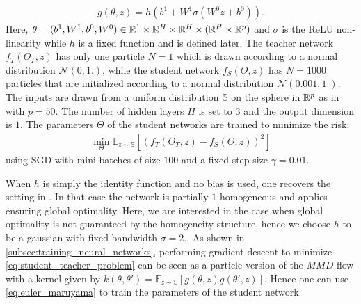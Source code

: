 \begin{align}
	g(\theta,z) = h(b^{1}+W^{1}\sigma(W^{0}z+b^{0})).
\end{align}
Here, $\theta = (b^{1},W^{1},b^{0},W^{0}) \in {{\mathbb R}}^1\times {{\mathbb R}}^{H}\times {{\mathbb R}}^{H} \times ({{\mathbb R}}^{H}\times{{\mathbb R}}^{p})$ and $\sigma$ is the ReLU non-linearity while $h$ is a fixed function and is defined later.
The teacher network $f_{T}(\Theta_T,z)$ has only one particle $N=1$ which is drawn  according to a normal distribution $\mathcal{N}(0,1.)$, while the student network $f_{S}(\Theta,z)$ has $N=1000$ particles that are initialized according to a normal distribution $\mathcal{N}(0.001,1.)$.  The inputs are drawn from a uniform distribution $\mathbb{S}$ on the sphere in ${{\mathbb R}}^p$ as in \cite{Chizat:2018a} with $p=50$. The number of hidden layers $H$ is set to $3$ and the output dimension is $1$.   
The parameters $\Theta$ of the student networks are trained to minimize the risk:
\begin{align}\label{eq:student_teacher_problem}
	\min_{\Theta} \mathbb{E}_{z\sim \mathbb{S} }[(f_T(\Theta_T,z )- f_S(\Theta,z))^2]
\end{align}
using SGD with mini-batches of size $100$ and a fixed step-size $\gamma=0.01$.

When $h$ is simply the identity function and no bias is used, one recovers the setting in \cite{Chizat:2018a}. In that case the network is partially $1$-homogeneous and \cite[Theorem 3.5]{Chizat:2018a} applies ensuring global optimality. Here, we are interested in the case when global optimality is not guaranteed by the homogeneity structure, hence we choose $h$ to be a gaussian with fixed bandwidth $\sigma=2.$. 
As shown in \cref{subsec:training_neural_networks}, performing gradient descent to minimize \cref{eq:student_teacher_problem} can be seen as a particle version of the $MMD$ flow with a kernel given by  $k(\theta,\theta') = \mathbb{E}_{z\sim\mathbb{S}}[g(\theta,z)g(\theta',z)] $. Hence one can use \cref{eq:euler_maruyama} to train the parameters of the student network. 

